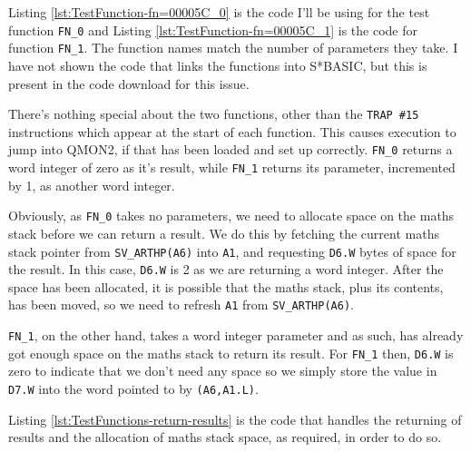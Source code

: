 Listing \ref{lst:TestFunction-fn=00005C_0} is the code I'll be using
for the test function \texttt{FN\_0} and Listing \ref{lst:TestFunction-fn=00005C_1}
is the code for function \texttt{FN\_1}. The function names match
the number of parameters they take. I have not shown the code that
links the functions into S{*}BASIC, but this is present in the code
download for this issue.

There's nothing special about the two functions, other than the \texttt{TRAP
\#15} instructions which appear at the start of each function. This
causes execution to jump into QMON2, if that has been loaded and set
up correctly. \texttt{FN\_0} returns a word integer of zero as it's
result, while \texttt{FN\_1} returns its parameter, incremented by
1, as another word integer.





Obviously, as \texttt{FN\_0} takes no parameters, we need to allocate
space on the maths stack before we can return a result. We do this
by fetching the current maths stack pointer from \texttt{SV\_ARTHP(A6)}
into \texttt{A1}, and requesting \texttt{D6.W} bytes of space for
the result. In this case, \texttt{D6.W} is 2 as we are returning a
word integer. After the space has been allocated, it is possible that
the maths stack, plus its contents, has been moved, so we need to
refresh \texttt{A1} from \texttt{SV\_ARTHP(A6)}. 

\texttt{FN\_1}, on the other hand, takes a word integer parameter
and as such, has already got enough space on the maths stack to return
its result. For \texttt{FN\_1} then, \texttt{D6.W} is zero to indicate
that we don't need any space so we simply store the value in \texttt{D7.W}
into the word pointed to by \texttt{(A6,A1.L)}.

Listing \ref{lst:TestFunctions-return-results} is the code that handles
the returning of results and the allocation of maths stack space,
as required, in order to do so.



